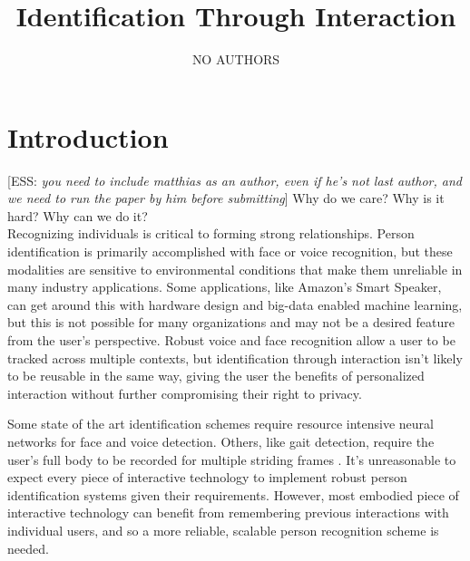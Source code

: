 \documentclass[conference]{IEEEtran}
\title{Identification Through Interaction}
\author{NO AUTHORS} %
\date{\vspace{-1em}}
\newcommand{\elaine}[1]{{\textcolor[rgb]{0.1,0.4,0.6}{[ESS: {\it #1}]}}}
\begin{document}
\maketitle


\section{Introduction}
\elaine{you need to include matthias as an author, even if he's not last author, and we need to run the paper by him before submitting}
Why do we care? Why is it hard? Why can we do it?\\

Recognizing individuals is critical to forming strong relationships. Person identification is primarily accomplished with face or voice recognition, but these modalities are sensitive to environmental conditions that make them unreliable in many industry applications. Some applications, like Amazon's Smart Speaker, can get around this with hardware design and big-data enabled machine learning, but this is not possible for many organizations and may not be a desired feature from the user's perspective. Robust voice and face recognition allow a user to be tracked across multiple contexts, but identification through interaction isn't likely to be reusable in the same way, giving the user the benefits of personalized interaction without further compromising their right to privacy.


Some state of the art identification schemes require resource intensive neural networks for face and voice detection. Others, like gait detection, require the user's full body to be recorded for multiple striding frames \cite{liang_wang_silhouette_2003}\cite{han_individual_2006}. It's unreasonable to expect every piece of interactive technology to implement robust person identification systems given their requirements. However, most embodied piece of interactive technology can benefit from remembering previous interactions with individual users, and so a more reliable, scalable person recognition scheme is needed. 
\end{document}
